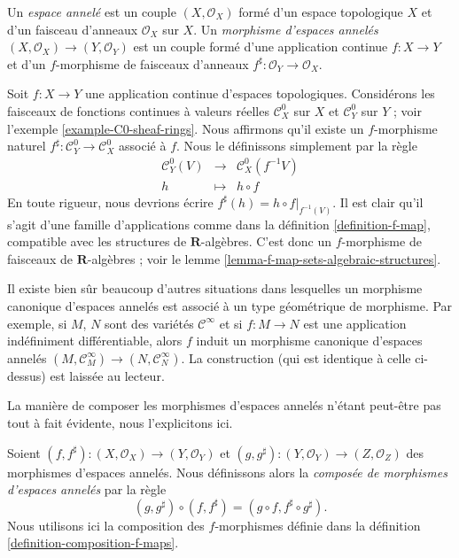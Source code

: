 \begin{definition}
\label{definition-ringed-space}
Un {\it espace annelé} est un couple $(X, \mathcal{O}_X)$ formé
d'un espace topologique $X$ et d'un faisceau d'anneaux $\mathcal{O}_X$
sur $X$. Un {\it morphisme d'espaces annelés}
$(X, \mathcal{O}_X) \to (Y, \mathcal{O}_Y)$ est un couple
formé d'une application continue $f : X \to Y$ et d'un
$f$-morphisme de faisceaux d'anneaux
$f^\sharp : \mathcal{O}_Y \to \mathcal{O}_X$.
\end{definition}

\begin{example}
\label{example-continuous-map-ringed}
Soit $f : X \to Y$ une application continue d'espaces topologiques.
Considérons les faisceaux de fonctions continues à valeurs réelles
$\mathcal{C}^0_X$ sur $X$ et $\mathcal{C}^0_Y$ sur $Y$ ;
voir l'exemple \ref{example-C0-sheaf-rings}. Nous affirmons qu'il
existe un $f$-morphisme naturel $f^\sharp : \mathcal{C}^0_Y \to \mathcal{C}^0_X$
associé à $f$. Nous le définissons simplement par la
règle
\begin{eqnarray*}
\mathcal{C}^0_Y(V) & \longrightarrow & \mathcal{C}^0_X(f^{-1}V) \\
h & \longmapsto & h \circ f
\end{eqnarray*}
En toute rigueur, nous devrions écrire $f^\sharp(h) = h \circ f|_{f^{-1}(V)}$.
Il est clair qu'il s'agit d'une famille d'applications comme dans la
définition \ref{definition-f-map}, compatible avec les structures de $\mathbf{R}$-algèbres.
C'est donc un $f$-morphisme de faisceaux de $\mathbf{R}$-algèbres ; voir le
lemme \ref{lemma-f-map-sets-algebraic-structures}.

\medskip\noindent
Il existe bien sûr beaucoup d'autres situations dans lesquelles un
morphisme canonique d'espaces annelés est associé à un type
géométrique de morphisme. Par exemple, si $M$, $N$ sont des variétés $\mathcal{C}^\infty$
et si $f : M \to N$ est une application indéfiniment différentiable, alors
$f$ induit un morphisme canonique d'espaces annelés
$(M, \mathcal{C}_M^\infty) \to (N, \mathcal{C}^\infty_N)$.
La construction (qui est identique à celle ci-dessus) est laissée
au lecteur.
\end{example}

\noindent
La manière de composer les morphismes d'espaces
annelés n'étant peut-être pas tout à fait évidente, nous l'explicitons ici.

\begin{definition}
\label{definition-composition-maps-ringed-spaces}
Soient
$(f, f^\sharp) : (X, \mathcal{O}_X) \to (Y, \mathcal{O}_Y)$ et
$(g, g^\sharp) : (Y, \mathcal{O}_Y) \to (Z, \mathcal{O}_Z)$
des morphismes d'espaces annelés. Nous définissons alors
la {\it composée de morphismes d'espaces annelés}
par la règle
$$
(g, g^\sharp) \circ (f, f^\sharp) = (g \circ f, f^\sharp \circ g^\sharp).
$$
Nous utilisons ici la composition des $f$-morphismes définie dans la
définition \ref{definition-composition-f-maps}.
\end{definition}



